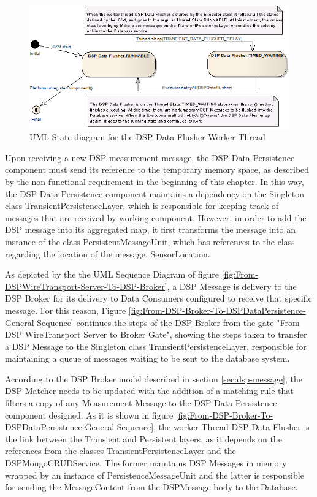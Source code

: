 \begin{figure}[!b]
  \centering
  \includegraphics[scale=0.5]{../diagrams/DSP-DataPersistence-Flusher-State-Diagram}
  \caption{UML State diagram for the DSP Data Flusher Worker Thread}
  \label{fig:DSP-DataPersistence-Flusher-State-Diagram}
\end{figure}

Upon receiving a new DSP measurement message, the DSP Data Persistence
component must send its reference to the temporary memory space, as described
by the non-functional requirement in the beginning of this chapter. In this
way, the DSP Data Persistence component maintains a dependency on the
Singleton class TransientPersistenceLayer, which is responsible for keeping
track of messages that are received by working component. However, in order to
add the DSP message into its aggregated map, it first transforms the message
into an instance of the class PersistentMessageUnit, which has references to
the class regarding the location of the message, SensorLocation.

As depicted by the the UML Sequence Diagram \cite{uml} of figure
\ref{fig:From-DSPWireTransport-Server-To-DSP-Broker}, a DSP Message
is delivery to the DSP Broker for its delivery to Data Consumers configured to
receive that specific message. For this reason, Figure
\ref{fig:From-DSP-Broker-To-DSPDataPersistence-General-Sequence} continues the
steps of the DSP Broker from the gate "From DSP WireTransport Server to Broker
Gate", showing the steps taken to transfer a DSP Message to the Singleton
class TransientPersistenceLayer, responsible for maintaining a queue of
messages waiting to be sent to the database system.

According to the DSP Broker model described in section \ref{sec:dsp-message}, 
the DSP Matcher needs to be updated with the addition of a matching rule that
filters a copy of any Measurement Message to the DSP Data Persistence component
designed. As it is shown in figure
\ref{fig:From-DSP-Broker-To-DSPDataPersistence-General-Sequence}, the worker
Thread DSP Data Flusher is the link between the Transient and Persistent
layers, as it depends on the references from the classes
TransientPersistenceLayer and the DSPMongoCRUDService. The former maintains
DSP Messages in memory wrapped by an instance of PersistenceMessageUnit and
the latter is responsible for sending the MessageContent from the DSPMessage
body to the Database.


